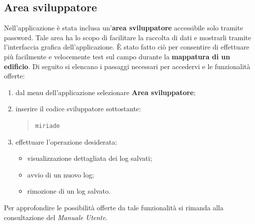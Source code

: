 \documentclass[../ManualeSviluppatore.tex]{subfiles}
\begin{document}
	\subsection{Area sviluppatore}
	Nell'applicazione è stata inclusa un'\textbf{area sviluppatore} accessibile solo tramite password. Tale area ha lo scopo di facilitare la raccolta di dati e mostrarli tramite l'interfaccia grafica dell'applicazione. È stato fatto ciò per consentire di effettuare più facilmente e velocemente test sul campo durante la \textbf{mappatura di un edificio}. Di seguito si elencano i passaggi necessari per accedervi e le funzionalità offerte:
	\begin{enumerate}
		\item dal menu dell'applicazione selezionare \textbf{Area sviluppatore};
		\item inserire il codice sviluppatore sottostante:
		\begin{quote}
			\centering
			\verb|miriade|
		\end{quote}
		\item effettuare l'operazione desiderata:
		\begin{itemize}
			\item visualizzazione dettagliata dei log salvati;
			\item avvio di un nuovo log;
			\item rimozione di un log salvato.
		\end{itemize}
	\end{enumerate}		
	
	Per approfondire le possibilità offerte da tale funzionalità si rimanda alla consultazione del \textit{Manuale Utente}.
\end{document}

